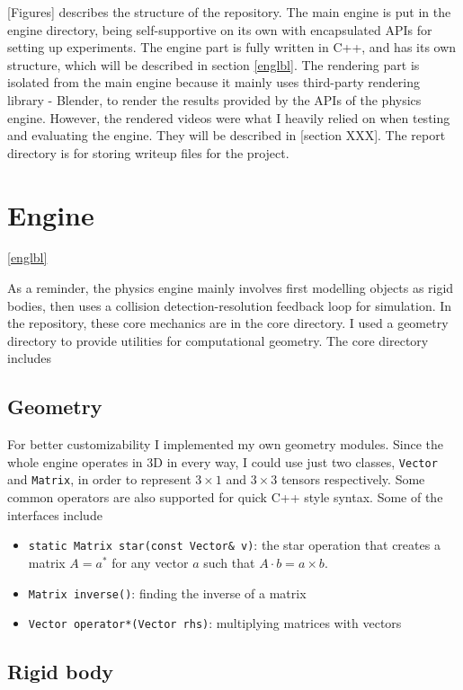 \documentclass[12pt,a4paper,twoside,openright]{report}
\newcommand{\code}{\texttt}
\begin{document}
[Figures] describes the structure of the repository. The main engine is put in the engine directory, being self-supportive on its own with encapsulated APIs for setting up experiments. The engine part is fully written in C++, and has its own structure, which will be described in section \ref{englbl}. The rendering part is isolated from the main engine because it mainly uses third-party rendering library - Blender, to render the results provided by the APIs of the physics engine. However, the rendered videos were what I heavily relied on when testing and evaluating the engine. They will be described in [section XXX]. The report directory is for storing writeup files for the project.

\section{Engine}\ref{englbl}

As a reminder, the physics engine mainly involves first modelling objects as rigid bodies, then uses a collision detection-resolution feedback loop for simulation. In the repository, these core mechanics are in the core directory. I used a geometry directory to provide utilities for computational geometry. The core directory includes 

\subsection{Geometry}

For better customizability I implemented my own geometry modules. Since the whole engine operates in 3D in every way, I could use just two classes, \code{Vector} and \code{Matrix}, in order to represent $3 \times 1$ and $3 \times 3$ tensors respectively. Some common operators are also supported for quick C++ style syntax. Some of the interfaces include

\begin{itemize}
\item \code{static Matrix star(const Vector\& v)}: the star operation that creates a matrix $A=a^*$ for any vector $a$ such that $A \cdot b = a\times b$.
\item \code{Matrix inverse()}: finding the inverse of a matrix
\item \code{Vector operator*(Vector rhs)}: multiplying matrices with vectors
\end{itemize}

\subsection{Rigid body}
\end{document}

